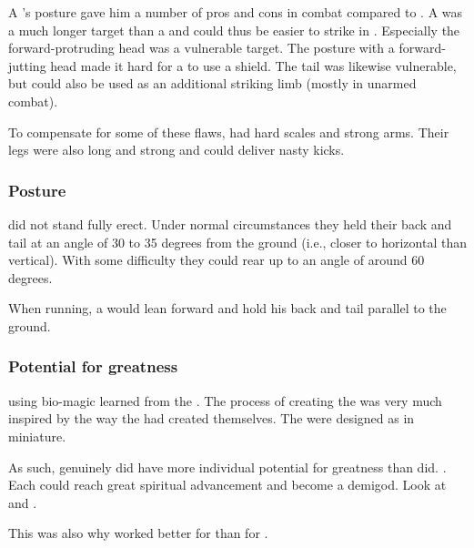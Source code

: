 A \scatha's posture gave him a number of pros and cons in combat compared to \humans. 
A \scatha was a much longer target than a \human and could thus be easier to strike in \melee.
Especially the forward-protruding head was a vulnerable target. 
The posture with a forward-jutting head made it hard for a \scatha to use a shield. 
The tail was likewise vulnerable, but could also be used as an additional striking limb (mostly in unarmed combat).

To compensate for some of these flaws, \scathae had hard scales and strong arms. 
Their legs were also long and strong and could deliver nasty kicks. 





\subsubsection{Posture}
\Scathae did not stand fully erect. 
Under normal circumstances they held their back and tail at an angle of 30 to 35 degrees from the ground (i.e., closer to horizontal than vertical). 
With some difficulty they could rear up to an angle of around 60 degrees. 

When running, a \scatha would lean forward and hold his back and tail parallel to the ground. 





\subsubsection{Potential for greatness}
 using bio-magic learned from the \xss.
The process of creating the \scathae was very much inspired by the way the \dragons had created themselves.
The \scathae were designed as \dragons in miniature.

As such, \scathae genuinely did have more individual potential for greatness than \humans did.
.
Each \scatha could reach great spiritual advancement and become a demigod.
Look at  and . 

This was also why  worked better for \scathae than for \humans. 





